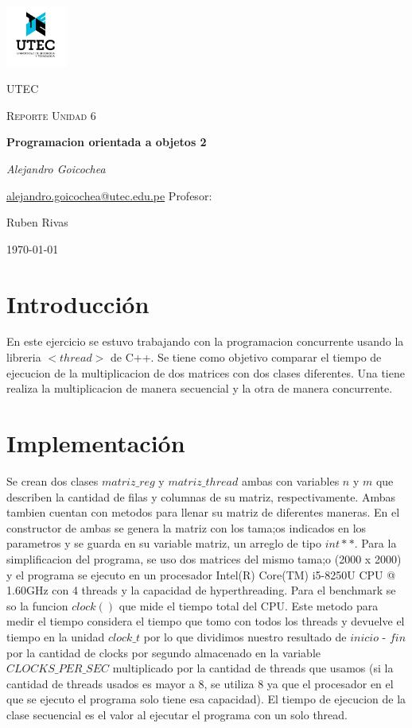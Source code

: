 \documentclass[12pt,a4paper]{article}
\begin{document}
\begin{titlepage}
	\centering
	\includegraphics[width=0.15\textwidth]{utec.png}\par\vspace{1cm}
	{\scshape\LARGE UTEC \par}
	\vspace{1cm}
	{\scshape\Large Reporte Unidad 6\par}
	\vspace{1.5cm}
	{\huge\bfseries Programacion orientada a objetos 2\par}
	\vspace{2cm}
	{\Large\itshape Alejandro Goicochea\par}
	\href{mailto:alejandro.goicochea@utec.edu.pe}{alejandro.goicochea@utec.edu.pe}
	\vfill
	Profesor:\par
	Ruben Rivas

	\vfill
	{\large \today\par}
\end{titlepage}

\section{Introducción}
En este ejercicio se estuvo trabajando con la programacion concurrente usando la libreria $<thread>$ de C++.
Se tiene como objetivo comparar el tiempo de ejecucion de la multiplicacion de dos matrices con dos clases diferentes.
Una tiene realiza la multiplicacion de manera secuencial y la otra de manera concurrente.

\section{Implementación}
Se crean dos clases $matriz\_reg$ y $matriz\_thread$ ambas con variables $n$ y $m$ que describen la cantidad 
de filas y columnas de su matriz, respectivamente. Ambas tambien cuentan con metodos para llenar su matriz de diferentes 
maneras. En el constructor de ambas se genera la matriz con los tama;os indicados en los parametros y se guarda en su variable 
matriz, un arreglo de tipo $int**$. Para la simplificacion del programa, se uso dos matrices del mismo tama;o (2000 x 2000) 
y el programa se ejecuto en un procesador Intel(R) Core(TM) i5-8250U CPU @ 1.60GHz con 4 threads y la capacidad de hyperthreading. Para el benchmark se so la funcion
$clock()$ que mide el tiempo total del CPU. Este metodo para medir el tiempo considera el tiempo que tomo con todos los threads y devuelve 
el tiempo en la unidad $clock\_t$ por lo que dividimos nuestro resultado de $inicio$ - $fin$ por la cantidad de clocks por segundo almacenado 
en la variable $CLOCKS\_PER\_SEC$ multiplicado por la cantidad de threads que usamos (si la cantidad de threads usados es mayor a 8, se utiliza 
8 ya que el procesador en el que se ejecuto el programa solo tiene esa capacidad). El tiempo de ejecucion de la clase secuencial es el valor al ejecutar el 
programa con un solo thread.
\end{document}
